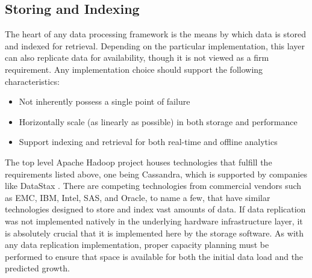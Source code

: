 \subsection{Storing and Indexing}
The heart of any data processing framework is the means by which data is stored and indexed for retrieval. Depending on the particular implementation, this layer can also replicate data for availability, though it is not viewed as a firm requirement. Any implementation choice should support the following characteristics:
\begin{itemize}
	\item Not inherently possess a single point of failure
	\item Horizontally scale (as linearly as possible) in both storage and performance
	\item Support indexing and retrieval for both real-time and offline analytics
\end{itemize}
The top level Apache Hadoop project houses technologies that fulfill the requirements listed above, one being Cassandra, which is supported by companies like DataStax \cite{cassandra}. There are competing technologies from commercial vendors such as EMC, IBM, Intel, SAS, and Oracle, to name a few, that have similar technologies designed to store and index vast amounts of data. If data replication was not implemented natively in the underlying hardware infrastructure layer, it is absolutely crucial that it is implemented here by the storage software. As with any data replication implementation, proper capacity planning must be performed to ensure that space is available for both the initial data load and the predicted growth.\\

